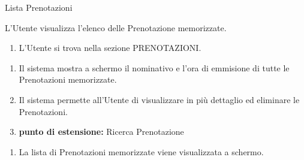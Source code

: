 {\ucTable	%
{	%
	Lista Prenotazioni
	
}{	%
	
}{	%
	L'Utente visualizza l'elenco delle Prenotazione memorizzate.
	
}{	%
	\attori
	
}{	%
	\begin{enumerate}
        \item L'Utente si trova nella sezione PRENOTAZIONI.
    \end{enumerate}
	
}{	%
	\begin{enumerate}
        \item Il sistema mostra a schermo il nominativo e l'ora di emmisione di tutte le Prenotazioni memorizzate.
        \item Il sistema permette all'Utente di visualizzare in più dettaglio ed eliminare le Prenotazioni.
        \item[] \textbf{punto di estensione:} Ricerca Prenotazione
    \end{enumerate}
	
}{	%
	\begin{enumerate}
        \item La lista di Prenotazioni memorizzate viene visualizzata a schermo.
    \end{enumerate}
	
}{	%
} }


